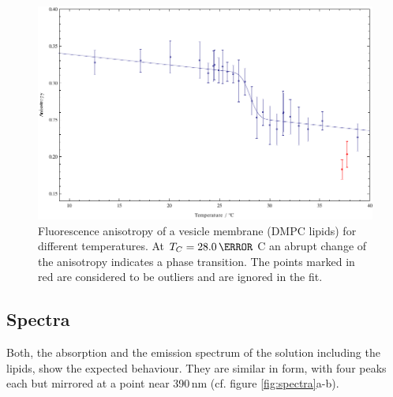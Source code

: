 \documentclass{scrartcl}
\numberwithin{equation}{section}
\numberwithin{figure}{section}
\numberwithin{table}{section}
\begin{document}
\begin{figure}
\centering
\includegraphics[width=\linewidth]{img/phasetransition.pdf}
\caption{ \small Fluorescence anisotropy of a vesicle membrane (DMPC lipids) for different temperatures. At $T_C=28.0 \, \degree$ C an abrupt change of the anisotropy indicates a phase transition. The points marked in red are considered to be outliers and are ignored in the fit.}
\label{fig:phase}
\end{figure}



\subsection{Spectra}
Both, the absorption and the emission spectrum of the solution including the lipids, show the expected behaviour. They are similar in form, with four peaks each but mirrored at a point near 390\,nm (cf. figure \ref{fig:spectra}a-b).
\end{document}
